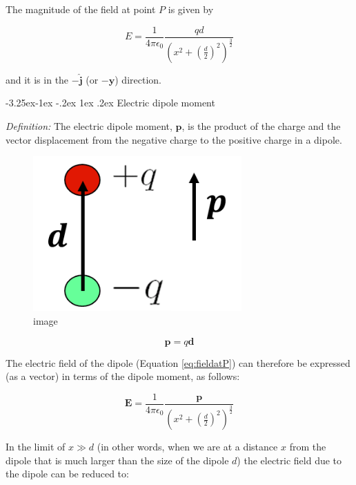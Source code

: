 \documentclass[
]{book}
\makeatletter
\renewcommand\subsection{%
\@startsection{subsection}{2}{\z@}%
              {-3.25ex\@plus -1ex \@minus -.2ex}%
              {1ex \@plus .2ex}%
              {\sffamily\bfseries}}
\numberwithin{equation}{section}
\makeatother
\begin{document}
The magnitude of the field at point \(P\) is given by

\begin{equation}
\label{eq:fieldatP}
E = \frac{1}{4 \pi \epsilon_0} \frac{qd}{\left( x^2 + \left( \frac{d}{2} \right)^2 \right)^{\frac{3}{2}}}
\end{equation}

and it is in the \(-\hat{\mathbf{j}}\) (or \(-\hat{\mathbf{y}}\)) direction.

\hypertarget{electric-dipole-moment}{%
\subsection{Electric dipole moment}\label{electric-dipole-moment}}

\emph{Definition:} The electric dipole moment, \(\mathbf{p}\), is the product of the
charge and the vector displacement from the negative charge to the
positive charge in a dipole.

\begin{figure}
\centering
\includegraphics[width=80mm,height=\textheight]{Figures/dipole_moment.png}
\caption{image}
\end{figure}

\begin{equation}
\label{eq:dipoleMoment}
\mathbf{p} = q \mathbf{d}
\end{equation}

The electric field of the dipole (Equation
\eqref{eq:fieldatP}) can therefore be expressed (as a vector) in
terms of the dipole moment, as follows:

\begin{equation}
\label{eq:fieldatPdipole}
\mathbf{E} = \frac{1}{4 \pi \epsilon_0} \frac{\mathbf{p}}{\left( x^2 + \left( \frac{d}{2} \right)^2 \right)^{\frac{3}{2}}}
\end{equation}

In the limit of \(x \gg d\) (in other words, when we are at a distance \(x\)
from the dipole that is much larger than the size of the dipole \(d\)) the
electric field due to the dipole can be reduced to:
\end{document}
